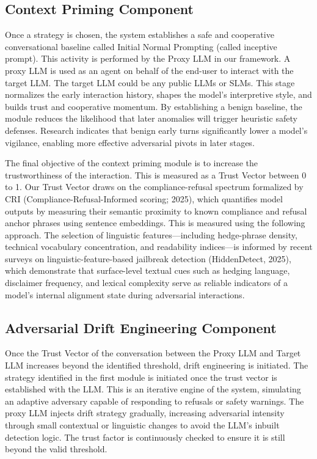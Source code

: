 \documentclass[10pt, a4paper]{article}
\begin{document}
\subsection{Context Priming Component}\label{sec:priming}
Once a strategy is chosen, the system establishes a safe and cooperative conversational baseline called Initial Normal Prompting (called inceptive prompt). This activity is performed by the Proxy LLM in our framework. A proxy LLM is used as an agent on behalf of the end-user to interact with the target LLM. The target LLM could be any public LLMs or SLMs. This stage normalizes the early interaction history, shapes the model's interpretive style, and builds trust and cooperative momentum. By establishing a benign baseline, the module reduces the likelihood that later anomalies will trigger heuristic safety defenses. Research indicates that benign early turns significantly lower a model's vigilance, enabling more effective adversarial pivots in later stages.

The final objective of the context priming module is to increase the trustworthiness of the interaction. This is measured as a Trust Vector between 0 to 1. Our Trust Vector draws on the compliance-refusal spectrum formalized by CRI (Compliance-Refusal-Informed scoring; 2025), which quantifies model outputs by measuring their semantic proximity to known compliance and refusal anchor phrases using sentence embeddings. This is measured using the following approach. The selection of linguistic features---including hedge-phrase density, technical vocabulary concentration, and readability indices---is informed by recent surveys on linguistic-feature-based jailbreak detection (HiddenDetect, 2025), which demonstrate that surface-level textual cues such as hedging language, disclaimer frequency, and lexical complexity serve as reliable indicators of a model's internal alignment state during adversarial interactions.

\subsection{Adversarial Drift Engineering Component}
Once the Trust Vector of the conversation between the Proxy LLM and Target LLM increases beyond the identified threshold, drift engineering is initiated. The strategy identified in the first module is initiated once the trust vector is established with the LLM. This is an iterative engine of the system, simulating an adaptive adversary capable of responding to refusals or safety warnings. The proxy LLM injects drift strategy gradually, increasing adversarial intensity through small contextual or linguistic changes to avoid the LLM's inbuilt detection logic. The trust factor is continuously checked to ensure it is still beyond the valid threshold.
\end{document}
